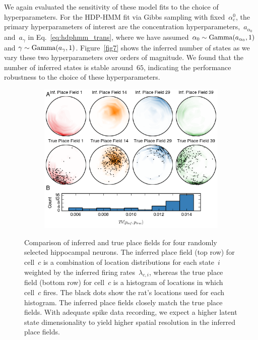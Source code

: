 We again evaluated the sensitivity of these model fits to the choice of hyperparameters. For the HDP-HMM fit via Gibbs sampling with fixed~$\alpha_c^0$, the primary hyperparameters of interest are the concentration hyperparameters,~$a_{\alpha_0}$ and~$a_{\gamma}$ in Eq.~\ref{eq:hdphmm_trans}, where we have assumed $ \alpha_0 \sim \mathrm{Gamma}(a_{\alpha_0}, 1)$ and $ \gamma \sim \mathrm{Gamma}(a_\gamma, 1) $. 
Figure~\ref{fig7} shows the inferred number of states as we vary these two hyperparameters over orders of magnitude. We found that the number of inferred states is stable around~$65$, indicating the performance robustness to the choice of these hyperparameters. 

\begin{figure}
\centering
\begin{subfigure}[t]{5in}
\includegraphics[width=\textwidth]{figures/ch5/Fig8}
\end{subfigure}
\caption{Comparison of inferred and true place fields for four randomly selected hippocampal neurons. The inferred place field (top row) for cell~$c$ is a combination of location distributions for each state~$i$ weighted by the inferred firing rates~$\lambda_{c,i}$, whereas the true place field (bottom row) for cell~$c$ is a histogram of locations in which cell~$c$ fires. The black dots show the rat's locations used for each histogram. The inferred place fields closely match the true place fields. With adequate spike data recording, we expect a higher latent state dimensionality to yield higher spatial resolution in the inferred place fields.}
\label{fig8}
\end{figure}

